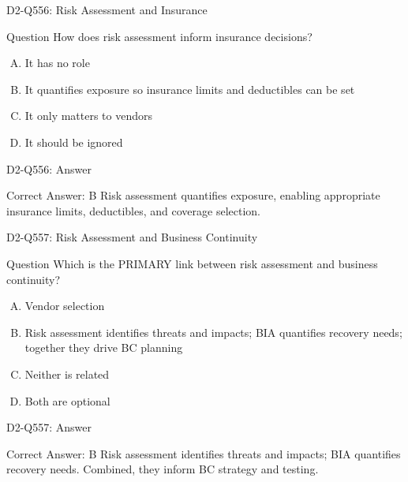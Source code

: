 \documentclass{beamer}
\begin{document}
	\begin{frame}{D2-Q556: Risk Assessment and Insurance}
		\begin{block}{Question}
			How does risk assessment inform insurance decisions?
		\end{block}
		\begin{enumerate}[(A)]
			\item It has no role
			\item It quantifies exposure so insurance limits and deductibles can be set
			\item It only matters to vendors
			\item It should be ignored
		\end{enumerate}
	\end{frame}
	\begin{frame}{D2-Q556: Answer}
		\begin{block}{Correct Answer: B}
			Risk assessment quantifies exposure, enabling appropriate insurance limits, deductibles, and coverage selection.
		\end{block}
	\end{frame}
	
	\begin{frame}{D2-Q557: Risk Assessment and Business Continuity}
		\begin{block}{Question}
			Which is the PRIMARY link between risk assessment and business continuity?
		\end{block}
		\begin{enumerate}[(A)]
			\item Vendor selection
			\item Risk assessment identifies threats and impacts; BIA quantifies recovery needs; together they drive BC planning
			\item Neither is related
			\item Both are optional
		\end{enumerate}
	\end{frame}
	\begin{frame}{D2-Q557: Answer}
		\begin{block}{Correct Answer: B}
			Risk assessment identifies threats and impacts; BIA quantifies recovery needs. Combined, they inform BC strategy and testing.
		\end{block}
	\end{frame}
	
\end{document}
